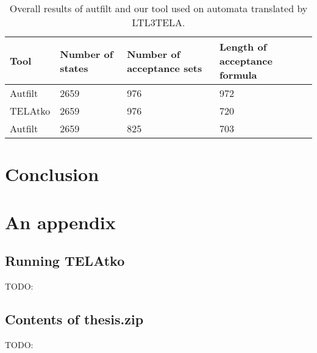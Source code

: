 \documentclass[
  digital, %
  twoside, %
  table,   %
  lof,     %
  lot,     %
]{fithesis3}
\begin{document}
\begin{table}[h]
  \begin{tabularx}{\textwidth}{lXXX}
    \toprule
    Tool & Number of states & Number of acceptance sets & Length of acceptance formula  \\
    \midrule
    Autfilt & 2659 & 976 & 972 \\
    TELAtko & 2659 & 976 & 720 \\
    Autfilt & 2659 & 825 & 703 \\    
    \bottomrule
  \end{tabularx}
  \caption{Overall results of autfilt and our tool used on automata translated by LTL3TELA.}
  \label{tab:ltl3tela}
\end{table}

\begin{figure}[h]
  \centering
    \begin{tikzpicture}
      
    \end{tikzpicture}
  \caption{}
  \label{fig:scplot_formula_len}
\end{figure}

\begin{figure}[h]
  \centering
    \begin{tikzpicture}
      
    \end{tikzpicture}
  \caption{}
  \label{fig:scplot_formula_len}
\end{figure}

\chapter{Conclusion}

\printbibliography[heading=bibintoc]

\makeatletter\thesis@blocks@clear\makeatother
{}
{} 
\printindex

\appendix
\chapter{An appendix}
\section{Running TELAtko}
TODO:
\section{Contents of thesis.zip}
TODO:
\end{document}
